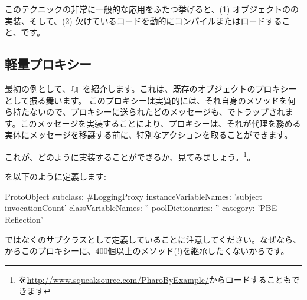 \documentclass[a4paper,10pt,twoside]{book}
\begin{document}
このテクニックの非常に一般的な応用をふたつ挙げると、(1) オブジェクトのの実装、そして、(2) 欠けているコードを動的にコンパイルまたはロードすること、です。

\subsection{軽量プロキシー}

最初の例として、『』を紹介します。これは、既存のオブジェクトのプロキシーとして振る舞います。
このプロキシーは実質的には、それ自身のメソッドを何ら持たないので、プロキシーに送られたどのメッセージも、でトラップされます。このメッセージを実装することにより、プロキシーは、それが代理を務める実体にメッセージを移譲する前に、特別なアクションを取ることができます。%

これが、どのように実装することができるか、見てみましょう。\footnote{を\url{http://www.squeaksource.com/PharoByExample/}からロードすることもできます}。

を以下のように定義します:
\begin{code}{}
ProtoObject subclass: #LoggingProxy
	instanceVariableNames: 'subject invocationCount'
	classVariableNames: ''
	poolDictionaries: ''
	category: 'PBE-Reflection'
\end{code}
ではなくのサブクラスとして定義していることに注意してください。なぜなら、からこのプロキシーに、400個以上のメソッド(!)を継承したくないからです。
\end{document}
